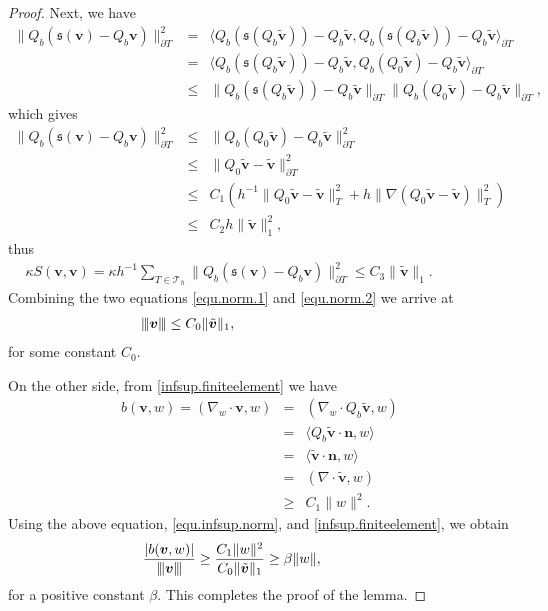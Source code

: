 \documentclass[final,leqno]{siamltex704}
\newcommand{\vertiii}[1]{{\left\vert\kern-0.25ex\left\vert\kern-0.25ex\left\vert #1
    \right\vert\kern-0.25ex\right\vert\kern-0.25ex\right\vert}}
\def\S{{\mathfrak s}}
\def\T{{\mathcal T}}
\begin{document}
\begin{proof}
Next, we have
\begin{eqnarray*}
\|Q_b(\S(\bm{v})-Q_b \bm{v})\|^2_{\partial T}
&=&\langle Q_b(\S(Q_b \tilde{\bm{v}})) - Q_b \tilde{\bm{v}}, Q_b(\S(Q_b \tilde{\bm{v}})) - Q_b \tilde{\bm{v}}\rangle_{\partial T}\\
&=&\langle Q_b(\S(Q_b \tilde{\bm{v}})) - Q_b \tilde{\bm{v}}, Q_b(Q_0 \tilde{\bm{v}}) - Q_b \tilde{\bm{v}}\rangle_{\partial T} \nonumber\\
&\leq & \|Q_b(\S(Q_b \tilde{\bm{v}})) - Q_b \tilde{\bm{v}}\|_{\partial T} \|Q_b(Q_0 \tilde{\bm{v}}) - Q_b \tilde{\bm{v}}\|_{\partial T}, \nonumber
\end{eqnarray*}
which gives
\begin{eqnarray*}
\|Q_b(\S(\bm{v})-Q_b \bm{v})\|^2_{\partial T}
&\leq& \|Q_b(Q_0 \tilde{\bm{v}}) - Q_b \tilde{\bm{v}}\|^2_{\partial T} ~~~~~~~~~~~~~~~~~~~~~~~~~~~~~~~~\\
&\leq& \|Q_0 \tilde{\bm{v}} - \tilde{\bm{v}}\|^2_{\partial T}\nonumber\\
&\leq&  C_1 (h^{-1}\|Q_0 \tilde{\bm{v}} - \tilde{\bm{v}}\|^2_{T} + h\|\nabla (Q_0\tilde{\bm{v}}-\tilde{\bm{v}})\|^2_{T})\nonumber\\
&\leq&  C_2 h \|\tilde{\bm{v}}\|_1^2, \nonumber
\end{eqnarray*}
thus
\begin{eqnarray}\label{equ.norm.2}
\kappa {S}(\bm{v},\bm{v})=\kappa h^{-1}\sum_{T\in\T_h}\|Q_b(\S(\bm{v})-Q_b \bm{v})\|^2_{\partial T} \leq C_3 \|\tilde{\bm{v}}\|_1.~~~~~~~~~~~~~~~~~~~~
\end{eqnarray}
Combining the two equations \eqref{equ.norm.1} and \eqref{equ.norm.2} we arrive at
\begin{eqnarray}\label{equ.infsup.norm}
 \vertiii{\bm{v}} \leq C_0 \|\tilde{\bm{v}}\|_1,~~~~~~~~~~~~~~~~~~~~~~~~~~~~~~~
\end{eqnarray}
for some constant $C_0$.

On the other side, from \eqref{infsup.finiteelement} we have
\begin{eqnarray}\label{equ.infsup.bilinear}
   b(\bm{v},w)
  = (\nabla_w \cdot\bm{v},w)
& = & (\nabla_w \cdot Q_b\tilde{\bm{v}},w)\\
& = &  \langle Q_b\tilde{\bm{v}}\cdot \bm{n},w \rangle \nonumber\\
& = &  \langle \tilde{\bm{v}}\cdot \bm{n},w \rangle \nonumber\\
& = & (\nabla \cdot \tilde{\bm{v}},w ) \nonumber\\
& \geq & C_1\|w\|^2.\nonumber
\end{eqnarray}
Using the above equation, \eqref{equ.infsup.norm}, and \eqref{infsup.finiteelement}, we obtain
\begin{eqnarray}
\frac{ |b(\bm{v},w)|}{\vertiii{\bm{v}} } \geq \frac{C_1\|w\|^2}{C_0 \|\tilde{\bm{v}}\|_1}\geq \beta \|w\|,~~~~~~~~~~~~
\end{eqnarray}
for a positive constant $\beta$. This completes the proof of the lemma.
\end{proof}
\end{document}
